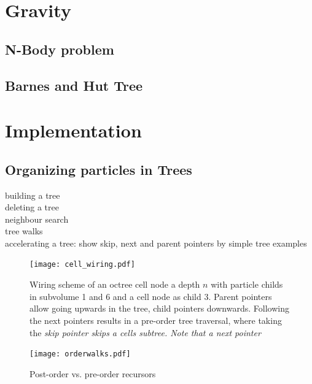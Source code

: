 \section{Gravity}

\subsection{N-Body problem}

\subsection{Barnes and Hut Tree}







\section{Implementation}
\subsection{Organizing particles in Trees}
building a tree\\
deleting a tree\\
neighbour search\\
tree walks\\
accelerating a tree: show skip, next and parent pointers by simple tree examples\\

\begin{figure}[htbp]
\begin{center}
\texttt{[image: cell\_wiring.pdf]}
\caption{Wiring scheme of an octree cell node a depth $n$ with particle childs in subvolume 1 and 6 and a cell node as child 3. Parent pointers allow going upwards in the tree, child pointers downwards. Following the next pointers results in a pre-order tree traversal, where taking the \it{skip} pointer skips a cells subtree. Note that a \it{next} pointer }
\label{fig02walks}
\end{center}
\end{figure}


\begin{figure}[htbp]
\begin{center}
\texttt{[image: orderwalks.pdf]}
\caption{Post-order vs. pre-order recursors}
\label{fig02walks}
\end{center}
\end{figure}

